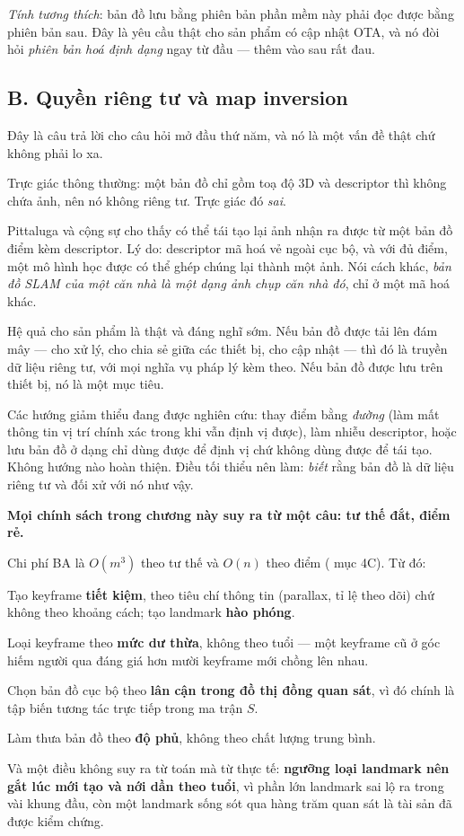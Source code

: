 \documentclass[../../vslam.tex]{subfiles}
\begin{document}
\emph{Tính tương thích}: bản đồ lưu bằng phiên bản phần mềm này phải đọc được bằng phiên bản sau. Đây là yêu cầu thật cho sản phẩm có cập nhật OTA, và nó đòi hỏi \emph{phiên bản hoá định dạng} ngay từ đầu --- thêm vào sau rất đau.

\subsection{B. Quyền riêng tư và map inversion}

Đây là câu trả lời cho câu hỏi mở đầu thứ năm, và nó là một vấn đề thật chứ không phải lo xa.

Trực giác thông thường: một bản đồ chỉ gồm toạ độ \(3\)D và descriptor thì không chứa ảnh, nên nó không riêng tư. Trực giác đó \emph{sai}.

Pittaluga và cộng sự \cite{pittaluga2019revealing} cho thấy có thể tái tạo lại ảnh nhận ra được từ một bản đồ điểm kèm descriptor. Lý do: descriptor mã hoá vẻ ngoài cục bộ, và với đủ điểm, một mô hình học được có thể ghép chúng lại thành một ảnh. Nói cách khác, \emph{bản đồ SLAM của một căn nhà là một dạng ảnh chụp căn nhà đó}, chỉ ở một mã hoá khác.

Hệ quả cho sản phẩm là thật và đáng nghĩ sớm. Nếu bản đồ được tải lên đám mây --- cho xử lý, cho chia sẻ giữa các thiết bị, cho cập nhật --- thì đó là truyền dữ liệu riêng tư, với mọi nghĩa vụ pháp lý kèm theo. Nếu bản đồ được lưu trên thiết bị, nó là một mục tiêu.

Các hướng giảm thiểu đang được nghiên cứu: thay điểm bằng \emph{đường} (làm mất thông tin vị trí chính xác trong khi vẫn định vị được), làm nhiễu descriptor, hoặc lưu bản đồ ở dạng chỉ dùng được để định vị chứ không dùng được để tái tạo. Không hướng nào hoàn thiện. Điều tối thiểu nên làm: \emph{biết} rằng bản đồ là dữ liệu riêng tư và đối xử với nó như vậy.

\begin{cannho}
\textbf{Mọi chính sách trong chương này suy ra từ một câu: tư thế đắt, điểm rẻ.}

Chi phí BA là \(O(m^3)\) theo tư thế và \(O(n)\) theo điểm ( mục 4C). Từ đó:

Tạo keyframe \textbf{tiết kiệm}, theo tiêu chí thông tin (parallax, tỉ lệ theo dõi) chứ không theo khoảng cách; tạo landmark \textbf{hào phóng}.

Loại keyframe theo \textbf{mức dư thừa}, không theo tuổi --- một keyframe cũ ở góc hiếm người qua đáng giá hơn mười keyframe mới chồng lên nhau.

Chọn bản đồ cục bộ theo \textbf{lân cận trong đồ thị đồng quan sát}, vì đó chính là tập biến tương tác trực tiếp trong ma trận \(S\).

Làm thưa bản đồ theo \textbf{độ phủ}, không theo chất lượng trung bình.

Và một điều không suy ra từ toán mà từ thực tế: \textbf{ngưỡng loại landmark nên gắt lúc mới tạo và nới dần theo tuổi}, vì phần lớn landmark sai lộ ra trong vài khung đầu, còn một landmark sống sót qua hàng trăm quan sát là tài sản đã được kiểm chứng.
\end{cannho}
\end{document}

